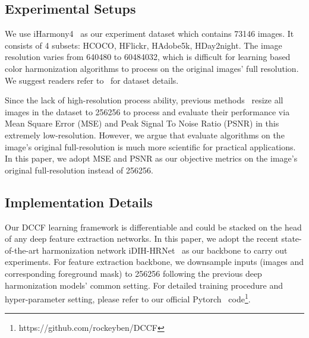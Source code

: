 \documentclass[runningheads]{llncs}
\begin{document}
    \subsection{Experimental Setups}
    We use iHarmony4~\cite{cong2020dovenet} as our experiment dataset which contains 73146 images. 
    It consists of 4 subsets: HCOCO, HFlickr, HAdobe5k, HDay2night.
    The image resolution varies from 640480 to 60484032,
    which is difficult for learning based color harmonization algorithms to process on the original images' full resolution.
    We suggest readers refer to~\cite{cong2020dovenet} for dataset details.
    
    Since the lack of high-resolution process ability, previous methods~\cite{tsai2017deep, cun2020improving, sofiiuk2021foreground, Ling_2021_CVPR, cong2020dovenet, cong2021bargainnet, guo2021intrinsic} resize all images in the dataset to 256256 to process and evaluate their performance via Mean Square Error (MSE) and Peak Signal To Noise Ratio (PSNR) in this extremely low-resolution.
    However, we argue that evaluate algorithms on the image's original full-resolution is much more scientific for practical applications.
    In this paper, we adopt MSE and PSNR as our objective metrics on the image's original full-resolution instead of 256256.
    
    
    \subsection{Implementation Details}
    Our DCCF learning framework is differentiable and could be stacked on the head of any deep feature extraction networks.
    In this paper, we adopt the recent state-of-the-art harmonization network iDIH-HRNet~\cite{sofiiuk2021foreground} as our backbone to carry out experiments.
    For feature extraction backbone, we downsample inputs (images and corresponding foreground mask) to 256256 following the previous deep harmonization models' common setting.
For detailed training procedure and hyper-parameter setting, please refer to our official Pytorch~\cite{paszke2019pytorch} code\footnote{https://github.com/rockeyben/DCCF}.
\end{document}
